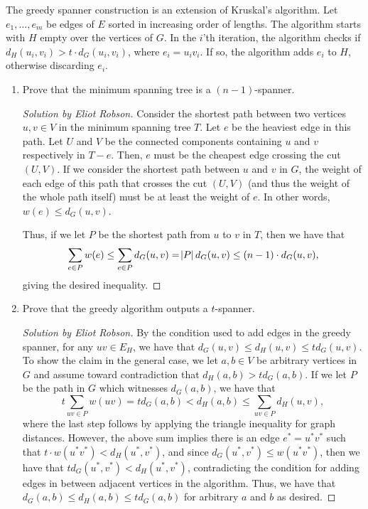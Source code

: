 \documentclass{article}
\newenvironment{solution}[1]{\begin{proof}[Solution by #1]}{\end{proof}}
\begin{document}
The greedy spanner construction is an extension of Kruskal's algorithm. Let \(e_1, \dots, e_m\) be edges of \(E\) sorted in increasing order of lengths. The algorithm starts with \(H\) empty over the vertices of \(G\). In the \(i\)'th iteration, the algorithm checks if \(d_H(u_i, v_i) > t \cdot d_G(u_i, v_i)\), where \(e_i = u_i v_i\). If so, the algorithm adds \(e_i\) to \(H\), otherwise discarding \(e_i\).

\begin{enumerate}
    \item Prove that the minimum spanning tree is a \((n-1)\)-spanner.
    
    \begin{solution}{Eliot Robson}
        Consider the shortest path between two vertices \(u,v \in V\) in the minimum spanning tree \(T\). Let \(e\) be the heaviest edge in this path. Let \(U\) and \(V\) be the connected components containing \(u\) and \(v\) respectively in \(T - e\). Then, \(e\) must be the cheapest edge crossing the cut \((U, V)\). If we consider the shortest path between \(u\) and \(v\) in \(G\), the weight of each edge of this path that crosses the cut \((U,V)\) (and thus the weight of the whole path itself) must be at least the weight of \(e\). In other words, \(w(e) \leq d_G (u,v)\).
        
        Thus, if we let \(P\) be the shortest path from \(u\) to \(v\) in \(T\), then we have that
        \[
            \sum_{e \in P} w(e)
            \leq%
            \sum_{e \in P} d_G(u,v)
            =%
            \abs{P} d_G(u,v)
            \leq%
            (n-1) \cdot d_G(u,v),
        \]
        giving the desired inequality.
    \end{solution}

    \item Prove that the greedy algorithm outputs a \(t\)-spanner.
    
    \begin{solution}{Eliot Robson}
        By the condition used to add edges in the greedy spanner, for any \(uv \in E_H\), we have that \(d_G(u,v) \leq d_H(u,v) \leq t d_G(u,v)\). To show the claim in the general case, we let \(a,b \in V\) be arbitrary vertices in \(G\) and assume toward contradiction that \(d_H(a,b) > t d_G(a,b)\). If we let \(P\) be the path in \(G\) which witnesses \(d_G(a,b)\), we have that
        \[
            t \sum_{uv \in P} w(uv)
            =%
            t d_G (a,b)
            <%
            d_H(a,b)
            \leq%
            \sum_{uv \in P} d_H (u,v),
        \]
        where the last step follows by applying the triangle inequality for graph distances. However, the above sum implies there is an edge \(e^* = u^* v^*\) such that \(t \cdot w(u^* v^*) < d_H(u^*, v^*)\),  and since \(d_G(u^*, v^*) \leq w(u^* v^*)\), then we have that \(t d_G(u^*, v^*) < d_H(u^*, v^*)\), contradicting the condition for adding edges in between adjacent vertices in the algorithm. Thus, we have that \(d_G(a,b) \leq d_H(a,b) \leq t d_G(a,b)\) for arbitrary \(a\) and \(b\) as desired.
    \end{solution}


\end{enumerate}
\end{document}

